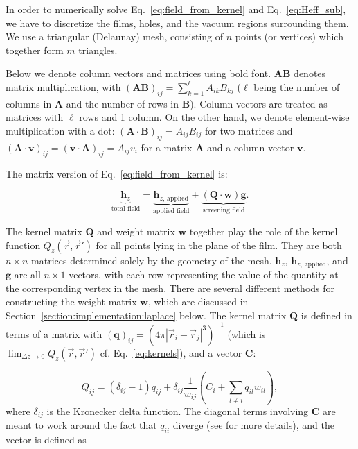 \documentclass{article}
\begin{document}
In order to numerically solve Eq.~\ref{eq:field_from_kernel} and Eq.~\ref{eq:Heff_sub}, we have to discretize the films, holes, and the vacuum regions surrounding them. We use a triangular
(Delaunay) mesh, consisting of $n$ points (or vertices)
which together form $m$ triangles.

Below we denote column vectors and matrices using bold font. $\mathbf{A}\mathbf{B}$
denotes matrix multiplication, with $(\mathbf{A}\mathbf{B})_{ij}=\sum_{k=1}^\ell A_{ik}B_{kj}$
($\ell$ being the number of columns in $\mathbf{A}$ and the number of rows in $\mathbf{B}$). Column vectors are treated as matrices with $\ell$ rows and 1 column. On the other hand, we denote element-wise multiplication with a dot: $(\mathbf{A}\cdot\mathbf{B})_{ij}=A_{ij}B_{ij}$ for two matrices
and $(\mathbf{A}\cdot\mathbf{v})_{ij}=(\mathbf{v}\cdot\mathbf{A})_{ij}=A_{ij}v_{i}$ for a matrix $\mathbf{A}$ and a column vector $\mathbf{v}$.

The matrix version of Eq.~\ref{eq:field_from_kernel} is:

\begin{equation}
    \label{eq:field_from_kernel_num}
    \underbrace{\mathbf{h}_z}_\text{total field}
    = \underbrace{\mathbf{h}_{z,\,\mathrm{applied}}}_\text{applied field}
    + \underbrace{(\mathbf{Q}\cdot\mathbf{w})\mathbf{g}}_\text{screening field}.
\end{equation}

The kernel matrix $\mathbf{Q}$ and weight matrix $\mathbf{w}$ together play the role of the
kernel function $Q_z(\vec{r},\vec{r}')$ for all points lying in the plane of the film. They are both $n\times n$ matrices determined solely by the geometry of the mesh.
$\mathbf{h}_z$, $\mathbf{h}_{z,\,\mathrm{applied}}$, and $\mathbf{g}$ are all $n\times 1$ vectors, with each row representing the value of the quantity at the
corresponding vertex in the mesh. There are several different methods for constructing the weight matrix $\mathbf{w}$, which are discussed in Section~\ref{section:implementation:laplace} below. The kernel
matrix $\mathbf{Q}$ is defined in terms of a matrix with
$(\mathbf{q})_{ij} = \left(4\pi|\vec{r}_i-\vec{r}_j|^3\right)^{-1}$
(which is $\lim_{\Delta z\to 0}Q_z(\vec{r},\vec{r}')$ cf. Eq.~\ref{eq:kernels}),
and a vector $\mathbf{C}$:

\begin{equation}
    \label{eq:kernel_matrix}
    Q_{ij} = (\delta_{ij}-1)q_{ij}
    + \delta_{ij}\frac{1}{w_{ij}}\left(C_i + \sum_{l\neq i}q_{il}w_{il}\right),
\end{equation}
where $\delta_{ij}$ is the Kronecker delta function. The diagonal terms involving $\mathbf{C}$ are meant to work around the fact that $q_{ii}$ diverge (see \cite{brandt_thin_2005} for more details), and the vector is defined as
\end{document}
